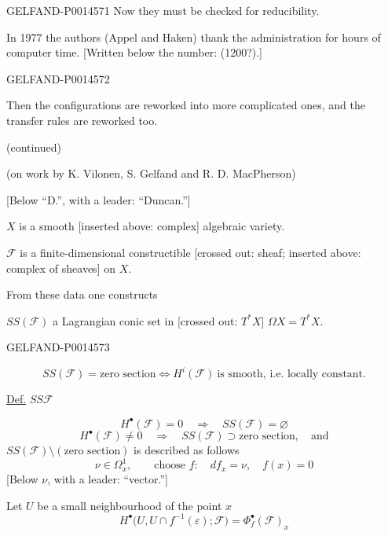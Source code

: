 \begin{GelfandAdjacentEvidence}{GELFAND-P001457}{1}
Now they must be checked for reducibility.

In 1977 the authors (Appel and Haken) thank the administration for  hours of computer time.
[Written below the number: (1200?).]
\end{GelfandAdjacentEvidence}
\begin{GelfandAdjacentEvidence}{GELFAND-P001457}{2}


Then the configurations are reworked into more complicated ones, and the transfer rules are reworked too.

 (continued)

(on work by K. Vilonen, S. Gelfand and R. D. MacPherson)

[Below “D.”, with a leader: “Duncan.”]

\(X\) is a smooth [inserted above: complex] algebraic variety.

\(\mathcal F\) is a finite-dimensional constructible [crossed out: sheaf; inserted above: complex of sheaves] on \(X\).

From these data one constructs

\(SS(\mathcal F)\) a Lagrangian conic set in [crossed out: \(T^*X\)] \(\Omega X=T^*X\).
\end{GelfandAdjacentEvidence}
\begin{GelfandAdjacentEvidence}{GELFAND-P001457}{3}


\[
SS(\mathcal F)=\text{zero section}
\Longleftrightarrow H^i(\mathcal F)\ \text{is smooth, i.e. locally constant}.
\]

\uline{Def.} \(SS\mathcal F\)

\begin{equation*}
H^\bullet(\mathcal F)=0\quad\Rightarrow\quad SS(\mathcal F)=\varnothing \tag{1}
\end{equation*}
\[
H^\bullet(\mathcal F)\ne0\quad\Rightarrow\quad
SS(\mathcal F)\supset\text{zero section},\quad\text{and}
\]
\(SS(\mathcal F)\setminus(\text{zero section})\) is described as follows
\[
\nu\in\Omega_x^1,\qquad\text{choose }f\colon\quad df_x=\nu,\quad f(x)=0
\]
[Below \(\nu\), with a leader: “vector.”]

Let \(U\) be a small neighbourhood of the point \(x\)
\begin{equation*}
H^\bullet\bigl(U,U\cap f^{-1}(\varepsilon);\mathcal F\bigr)
=\Phi_f^\bullet(\mathcal F)_x \tag{2}
\end{equation*}
\end{GelfandAdjacentEvidence}
